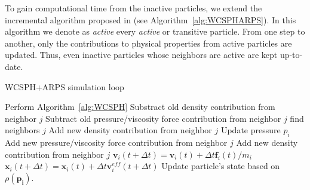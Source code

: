 To gain computational time from the inactive particles, we extend the incremental algorithm proposed in \cite{Artemova2012} (see Algorithm~\ref{alg:WCSPHARPS}).
In this algorithm we denote as \emph{active} every \emph{active} or {transitive} particle.
From one step to another, only the contributions to physical properties from active particles are updated. 
Thus, even inactive particles whose neighbors are active are kept up-to-date.
\begin{algorithm}[H]
    \caption[ARPS: WCSPH+ARPS simulation]{WCSPH+ARPS simulation loop}
    \label{alg:WCSPHARPS}
    \begin{algorithmic}
        \State Perform Algorithm~\ref{alg:WCSPH}
        \Else
            \State Substract old density contribution from neighbor $j$
	        \State Subtract old pressure/viscosity force contribution from neighbor $j$
            \EndFor
            \State find neighbors $j$
            \EndFor
            \State Add new density contribution from neighbor $j$
            \State Update pressure $p_{i}$
	        \State Add new pressure/viscosity force contribution from neighbor $j$
            \State Add new density contribution from neighbor $j$
            \EndFor
            \State $\mathbf{v}_{i}(t+\Delta t) = \mathbf{v}_{i}(t) + \Delta t \mathbf{f}_{i}(t)/m_{i}$
            \State $\mathbf{x}_{i}(t+\Delta t) = \mathbf{x}_{i}(t) + \Delta t \mathbf{v}^{eff}_{i}(t+\Delta t)$
            \State Update particle's state based on $\rho(\mathbf{p_{i}})$.
            \EndFor
        \EndIf
    \end{algorithmic}
\end{algorithm}

